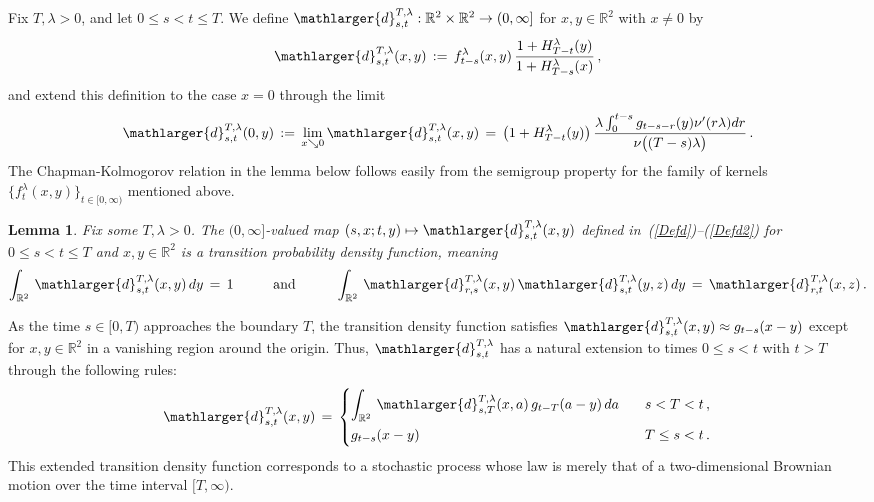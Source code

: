 \documentclass[10pt]{article}
\numberwithin{equation}{section}
\newtheorem{lemma}[theorem]{Lemma}
\theoremstyle{definition}
\newcommand{\R}{{\mathbb R}}
\begin{document}
Fix $T,\lambda >0$, and let $0\leq s<t\leq T$. We define $ \mathlarger{d}_{s,t}^{T,\lambda}:\R^2\times \R^2\rightarrow (0,\infty]$ for $x,y\in \R^2$ with $x\neq 0$ by
\begin{align} \label{Defd}
  \mathlarger{d}_{s,t}^{T,\lambda}(x,y)\,:=\, f_{t-s}^{\lambda}(x, y)\,\frac{1+H_{T-t}^{\lambda}(y) }{ 1+ H_{T-s}^{\lambda}(x) } \,, 
\end{align}
and extend this definition to the case $x=0$ through the limit
\begin{align}\label{Defd2}
\mathlarger{d}_{s,t}^{T,\lambda}(0,y)\,:=\,\lim _{x\searrow 0} \mathlarger{d}_{s,t}^{T,\lambda}(x,y)\,=\,\big(1+H_{T-t}^{\lambda}(y)\big)\, \frac{ \lambda \int_0^{t-s}g_{t-s-r}(y)\nu'( r \lambda)  dr}{\nu\big( (T-s)\lambda\big)  }  \,.  
\end{align}
The Chapman-Kolmogorov relation in the  lemma below  follows easily from the semigroup property for the family of kernels $\{ f_t^{\lambda}(x,y) \}_{t\in [0,\infty)}$ mentioned above.  
\begin{lemma}\label{PropTranKern}
 Fix some $T,\lambda>0$. The $(0,\infty]$-valued   map $(s, x; t, y)\mapsto   \mathlarger{d}_{s,t}^{T,\lambda }(x,y)  $ defined  in~(\ref{Defd})--(\ref{Defd2}) for $0\leq s<t\leq T$ and  $ x,y \in\R^2$ is a transition probability density function, meaning
 \begin{align*}
 \int_{\R^2} \,\mathlarger{d}_{s,t}^{T,\lambda }(x,y)\,dy\,=\,1  \hspace{1cm} \text{and} \hspace{1cm}
 \int_{\R^2} \,\mathlarger{d}_{r,s}^{T,\lambda}(x,y) \,\mathlarger{d}_{s,t}^{T,\lambda}(y,z)\,dy\,=\, \mathlarger{d}_{r,t}^{T,\lambda}(x,z)  \,.
 \end{align*}
\end{lemma}
As the time $s\in [0,T)$ approaches the boundary $T$, the transition density function satisfies $\mathlarger{d}_{s,t}^{T,\lambda }(x,y) \approx g_{t-s}(x-y)$ except for $x,y\in \R^2$ in a vanishing region around the origin.  Thus, $\mathlarger{d}_{s,t}^{T,\lambda }$  has a natural extension to times $0\leq s<t$ with $t > T$ through the following rules:
\begin{align}\label{JExtentd}
     \mathlarger{d}_{s,t}^{T ,\lambda }(x,y) \,=\,\begin{cases}  \displaystyle \int_{\R^2}  \, \mathlarger{d}_{s,T}^{T,\lambda  }(x,a)\,g_{t-T}(a-y)\, da   & \hspace{.3cm} s<T<t \,, \vspace{.1cm} \\ \displaystyle g_{t-s}(x-y)  & \hspace{.3cm} T\leq s<t \,. \end{cases}
\end{align}
This extended transition density function corresponds to   a stochastic process whose law is merely that of a two-dimensional Brownian motion over the time interval $[T,\infty)$.\vspace{.2cm}
\end{document}
